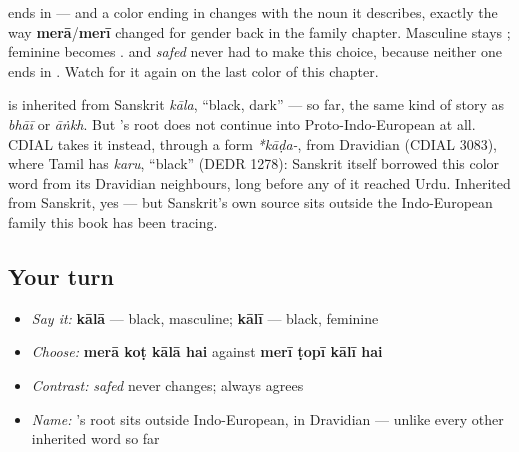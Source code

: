\begin{grammarlens}[title={Grammar Lens: a color that agrees like \ur{میرا}}]
\textbf{} ends in \textbf{} — and a color ending in \textbf{} changes with the noun it describes, exactly the way \textbf{merā}/\textbf{merī} changed for gender back in the family chapter. Masculine stays \textbf{}; feminine becomes \textbf{}. \textbf{} and \emph{safed} never had to make this choice, because neither one ends in \textbf{}. Watch for it again on the last color of this chapter.
\end{grammarlens}

\begin{cousinweb}
\textbf{} is inherited from Sanskrit \emph{kāla}, \textquotedblleft{}black, dark\textquotedblright{} — so far, the same kind of story as \emph{bhāī} or \emph{āṅkh}. But \textbf{}'s root does not continue into Proto-Indo-European at all. CDIAL takes it instead, through a form \emph{*kāḍa-}, from Dravidian (CDIAL 3083), where Tamil has \emph{karu}, \textquotedblleft{}black\textquotedblright{} (DEDR 1278): Sanskrit itself borrowed this color word from its Dravidian neighbours, long before any of it reached Urdu. Inherited from Sanskrit, yes — but Sanskrit's own source sits outside the Indo-European family this book has been tracing.
\end{cousinweb}

\subsection*{Your turn}
\begin{itemize}
\raggedright
  \item \emph{Say it:} \textbf{kālā} — black, masculine; \textbf{kālī} — black, feminine
  \item \emph{Choose:} \textbf{merā koṭ kālā hai} against \textbf{merī ṭopī kālī hai}
  \item \emph{Contrast:} \emph{safed} never changes; \textbf{} always agrees
  \item \emph{Name:} \textbf{}'s root sits outside Indo-European, in Dravidian — unlike every other inherited word so far
\end{itemize}

